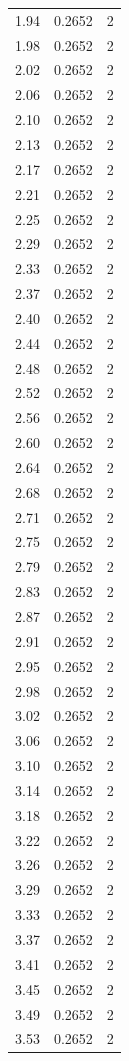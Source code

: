 \begin{longtable}{lrr}
  1.94 & 0.2652 & 2 \\
  1.98 & 0.2652 & 2 \\
  2.02 & 0.2652 & 2 \\
  2.06 & 0.2652 & 2 \\
  2.10 & 0.2652 & 2 \\
  2.13 & 0.2652 & 2 \\
  2.17 & 0.2652 & 2 \\
  2.21 & 0.2652 & 2 \\
  2.25 & 0.2652 & 2 \\
  2.29 & 0.2652 & 2 \\
  2.33 & 0.2652 & 2 \\
  2.37 & 0.2652 & 2 \\
  2.40 & 0.2652 & 2 \\
  2.44 & 0.2652 & 2 \\
  2.48 & 0.2652 & 2 \\
  2.52 & 0.2652 & 2 \\
  2.56 & 0.2652 & 2 \\
  2.60 & 0.2652 & 2 \\
  2.64 & 0.2652 & 2 \\
  2.68 & 0.2652 & 2 \\
  2.71 & 0.2652 & 2 \\
  2.75 & 0.2652 & 2 \\
  2.79 & 0.2652 & 2 \\
  2.83 & 0.2652 & 2 \\
  2.87 & 0.2652 & 2 \\
  2.91 & 0.2652 & 2 \\
  2.95 & 0.2652 & 2 \\
  2.98 & 0.2652 & 2 \\
  3.02 & 0.2652 & 2 \\
  3.06 & 0.2652 & 2 \\
  3.10 & 0.2652 & 2 \\
  3.14 & 0.2652 & 2 \\
  3.18 & 0.2652 & 2 \\
  3.22 & 0.2652 & 2 \\
  3.26 & 0.2652 & 2 \\
  3.29 & 0.2652 & 2 \\
  3.33 & 0.2652 & 2 \\
  3.37 & 0.2652 & 2 \\
  3.41 & 0.2652 & 2 \\
  3.45 & 0.2652 & 2 \\
  3.49 & 0.2652 & 2 \\
  3.53 & 0.2652 & 2 \\

\end{longtable}
